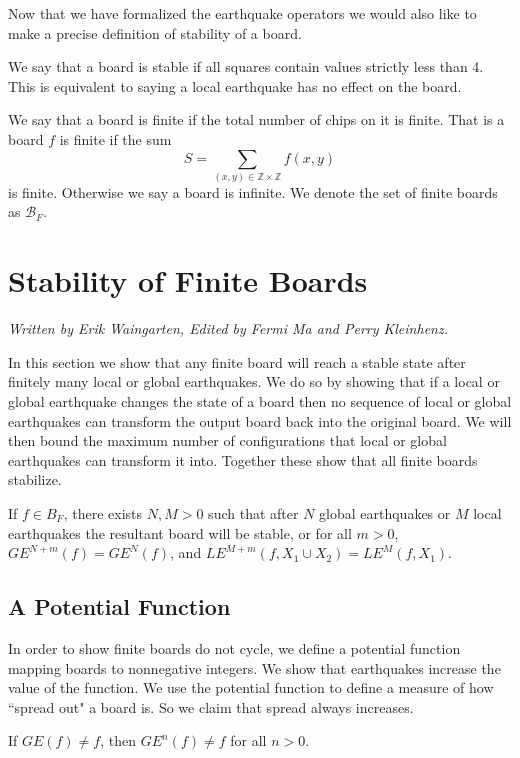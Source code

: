 \documentclass[runningheads,a4paper]{llncs}
\begin{document}
Now that we have formalized the earthquake operators we would also like to make a precise definition of stability of a board.
\begin{definition}
We say that a board is stable if all squares contain values strictly less than 4. This is equivalent to saying a local earthquake has no effect on the board. 
\end{definition}


\begin{definition} 
We say that a board is finite if the total number of chips on it is finite. That is a board $f$ is finite if the sum
\begin{equation}
S= \sum_{(x,y) \in \mathbb{Z} \times \mathbb{Z}} f(x,y) 
\end{equation}
is finite. Otherwise we say a board is infinite. 
We denote the set of finite boards as $\mathcal{B}_F$.
\end{definition}


\section{Stability of Finite Boards}
\label{Stability of Finite Boards}
\emph{Written by Erik Waingarten, Edited by Fermi Ma and Perry Kleinhenz.}

In this section we show that any finite board will reach a stable state after finitely many local or global earthquakes. 
We do so by showing that if a local or global earthquake changes the state of a board then no sequence of local or global earthquakes can transform the output board back into the original board. 
We will then bound the maximum number of configurations that local or global earthquakes can transform it into. 
Together these show that all finite boards stabilize. 
\begin{theorem}
\label{finitestability}
If $f \in B_F$, there exists $N, M > 0$ such that after $N$ global earthquakes or $M$ local earthquakes the resultant board will be stable, or for all $m > 0$, $GE^{N+m}(f) = GE^N(f)$, and $LE^{M+m}(f, X_1 \cup X_2) = LE^M(f, X_1)$.
\end{theorem}

\subsection{A Potential Function}
In order to show finite boards do not cycle, we define a potential function mapping boards to nonnegative integers. We show that earthquakes increase the value of the function. We use the potential function to define a measure of how ``spread out" a board is. So we claim that spread always increases.
\begin{lemma}
If $GE(f) \neq f$, then $GE^n(f) \neq f$ for all $n > 0$.
\end{lemma}
\end{document}
